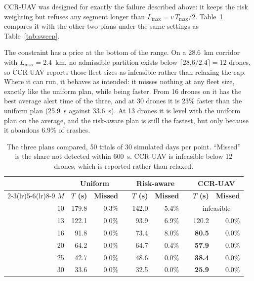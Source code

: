 \documentclass[11pt]{article}
\begin{document}
CCR-UAV was designed for exactly the failure described above: it keeps the
risk weighting but refuses any segment longer than
$L_{\max}=v\,T_{\max}/2$. Table~\ref{tab:ccr} compares it with the other two
plans under the same settings as Table~\ref{tab:sweep}.

The constraint has a price at the bottom of the range. On a 28.6~km corridor
with $L_{\max}=2.4$~km, no admissible partition exists below
$\lceil 28.6/2.4\rceil = 12$ drones, so CCR-UAV reports those fleet sizes as
infeasible rather than relaxing the cap. Where it can run, it behaves as
intended: it misses nothing at any fleet size, exactly like the uniform plan,
while being faster. From 16 drones on it has the best average alert time of
the three, and at 30 drones it is 23\% faster than the uniform plan
(25.9~s against 33.6~s). At 13 drones it is level with the uniform plan on
the average, and the risk-aware plan is still the fastest, but only because
it abandons 6.9\% of crashes.

\begin{table}[htbp]
\centering
\caption{The three plans compared, 50 trials of 30 simulated days per point.
``Missed'' is the share not detected within 600~s. CCR-UAV is infeasible
below 12 drones, which is reported rather than relaxed.}
\label{tab:ccr}
\small
\begin{tabular}{@{}rrrcrrcrr@{}}
\toprule
& \multicolumn{2}{c}{\textbf{Uniform}} & & \multicolumn{2}{c}{\textbf{Risk-aware}} & & \multicolumn{2}{c}{\textbf{CCR-UAV}}\\
\cmidrule(lr){2-3}\cmidrule(lr){5-6}\cmidrule(lr){8-9}
$M$ & \textbf{$T$ (s)} & \textbf{Missed} & & \textbf{$T$ (s)} & \textbf{Missed} & & \textbf{$T$ (s)} & \textbf{Missed} \\
\midrule
10 & 179.8 & 0.3\% & & 142.0 & 5.4\% & & \multicolumn{2}{c}{infeasible} \\
13 & 122.1 & 0.0\% & &  93.9 & 6.9\% & & 120.2 & 0.0\% \\
16 &  91.8 & 0.0\% & &  73.4 & 8.0\% & & \textbf{80.5} & 0.0\% \\
20 &  64.2 & 0.0\% & &  64.7 & 0.4\% & & \textbf{57.9} & 0.0\% \\
25 &  42.7 & 0.0\% & &  48.6 & 0.0\% & & \textbf{38.4} & 0.0\% \\
30 &  33.6 & 0.0\% & &  32.5 & 0.0\% & & \textbf{25.9} & 0.0\% \\
\bottomrule
\end{tabular}
\end{table}
\end{document}
